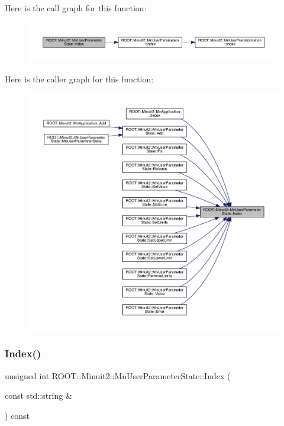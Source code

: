 Here is the call graph for this function\+:
\nopagebreak
\begin{figure}[H]
\begin{center}
\leavevmode
\includegraphics[width=350pt]{d3/de0/classROOT_1_1Minuit2_1_1MnUserParameterState_a2301d51ec17effc44792821d4482cb14_cgraph}
\end{center}
\end{figure}
Here is the caller graph for this function\+:
\nopagebreak
\begin{figure}[H]
\begin{center}
\leavevmode
\includegraphics[width=350pt]{d3/de0/classROOT_1_1Minuit2_1_1MnUserParameterState_a2301d51ec17effc44792821d4482cb14_icgraph}
\end{center}
\end{figure}
\mbox{\label{classROOT_1_1Minuit2_1_1MnUserParameterState_a2301d51ec17effc44792821d4482cb14}} 
\subsubsection{\texorpdfstring{Index()}{Index()}\hspace{0.1cm}{\footnotesize\ttfamily [3/3]}}
{\footnotesize\ttfamily unsigned int R\+O\+O\+T\+::\+Minuit2\+::\+Mn\+User\+Parameter\+State\+::\+Index (\begin{DoxyParamCaption}\item[{const std\+::string \&}]{ }\end{DoxyParamCaption}) const}

